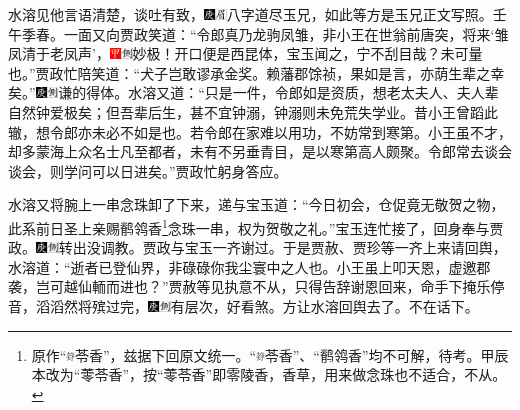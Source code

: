 水溶见他言语清楚，谈吐有致，{\includegraphics[width=3mm]{../Images/00004}\includegraphics[width=3mm]{../Images/00010}\footnotesize \kaishu 八字道尽玉兄，如此等方是玉兄正文写照。壬午季春。}一面又向贾政笑道：“令郎真乃龙驹凤雏，非小王在世翁前唐突，将来‘雏凤清于老凤声’，{\includegraphics[width=3mm]{../Images/00002}\includegraphics[width=3mm]{../Images/00011}\footnotesize \kaishu 妙极！开口便是西昆体，宝玉闻之，宁不刮目哉？}未可量也。”贾政忙陪笑道：“犬子岂敢谬承金奖。赖藩郡馀祯，果如是言，亦荫生辈之幸矣。”{\includegraphics[width=3mm]{../Images/00004}\includegraphics[width=3mm]{../Images/00011}\footnotesize \kaishu 谦的得体。}水溶又道：“只是一件，令郎如是资质，想老太夫人、夫人辈自然钟爱极矣；但吾辈后生，甚不宜钟溺，钟溺则未免荒失学业。昔小王曾蹈此辙，想令郎亦未必不如是也。若令郎在家难以用功，不妨常到寒第。小王虽不才，却多蒙海上众名士凡至都者，未有不另垂青目，是以寒第高人颇聚。令郎常去谈会谈会，则学问可以日进矣。”贾政忙躬身答应。

水溶又将腕上一串念珠卸了下来，递与宝玉道：“今日初会，仓促竟无敬贺之物，此系前日圣上亲赐鹡鸰香\footnote{原作“\includegraphics[width=6.4pt,height=6.4pt,align=c,vshift=1pt]{../images/00023}苓香”，兹据下回原文统一。“\includegraphics[width=6.4pt,height=6.4pt,align=c,vshift=1pt]{../images/00023}苓香”、“鹡鸰香”均不可解，待考。甲辰本改为“蕶苓香”，按“蕶苓香”即零陵香，香草，用来做念珠也不适合，不从。}念珠一串，权为贺敬之礼。”宝玉连忙接了，回身奉与贾政。{\includegraphics[width=3mm]{../Images/00004}\includegraphics[width=3mm]{../Images/00011}\footnotesize \kaishu 转出没调教。}贾政与宝玉一齐谢过。于是贾赦、贾珍等一齐上来请回舆，水溶道：“逝者已登仙界，非碌碌你我尘寰中之人也。小王虽上叩天恩，虚邀郡袭，岂可越仙輀而进也？”贾赦等见执意不从，只得告辞谢恩回来，命手下掩乐停音，滔滔然将殡过完，{\includegraphics[width=3mm]{../Images/00004}\includegraphics[width=3mm]{../Images/00011}\footnotesize \kaishu 有层次，好看煞。}方让水溶回舆去了。不在话下。

